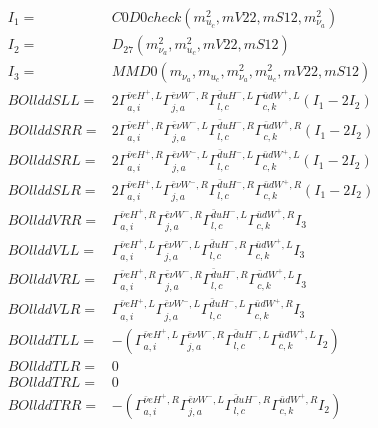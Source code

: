 \documentclass[A4,landscape]{article}
\begin{document}
\begin{align} 
I_1 = & C0D0check(m^2_{u_{{c}}}, mV22, mS12, m^2_{\nu_{{a}}}) \\ 
I_2 = & D_{27}(m^2_{\nu_{{a}}}, m^2_{u_{{c}}}, mV22, mS12) \\ 
I_3 = & MMD0(m_{\nu_{{a}}}, m_{u_{{c}}}, m^2_{\nu_{{a}}}, m^2_{u_{{c}}}, mV22, mS12) \\ 
  BOllddSLL= & 2  \Gamma^{\bar{\nu}e H^+ ,L}_{a, i} \Gamma^{\bar{e}\nu W^-,R}_{j, a} \Gamma^{\bar{d}u H^-,L}_{l, c} \Gamma^{\bar{u}d W^+ ,L}_{c, k} (I_1 - 2 I_2) \\ 
  BOllddSRR= & 2  \Gamma^{\bar{\nu}e H^+ ,R}_{a, i} \Gamma^{\bar{e}\nu W^-,L}_{j, a} \Gamma^{\bar{d}u H^-,R}_{l, c} \Gamma^{\bar{u}d W^+ ,R}_{c, k} (I_1 - 2 I_2) \\ 
  BOllddSRL= & 2  \Gamma^{\bar{\nu}e H^+ ,R}_{a, i} \Gamma^{\bar{e}\nu W^-,L}_{j, a} \Gamma^{\bar{d}u H^-,L}_{l, c} \Gamma^{\bar{u}d W^+ ,L}_{c, k} (I_1 - 2 I_2) \\ 
  BOllddSLR= & 2  \Gamma^{\bar{\nu}e H^+ ,L}_{a, i} \Gamma^{\bar{e}\nu W^-,R}_{j, a} \Gamma^{\bar{d}u H^-,R}_{l, c} \Gamma^{\bar{u}d W^+ ,R}_{c, k} (I_1 - 2 I_2) \\ 
  BOllddVRR= &  \Gamma^{\bar{\nu}e H^+ ,R}_{a, i} \Gamma^{\bar{e}\nu W^-,R}_{j, a} \Gamma^{\bar{d}u H^-,L}_{l, c} \Gamma^{\bar{u}d W^+ ,R}_{c, k} I_3 \\ 
  BOllddVLL= &  \Gamma^{\bar{\nu}e H^+ ,L}_{a, i} \Gamma^{\bar{e}\nu W^-,L}_{j, a} \Gamma^{\bar{d}u H^-,R}_{l, c} \Gamma^{\bar{u}d W^+ ,L}_{c, k} I_3 \\ 
  BOllddVRL= &  \Gamma^{\bar{\nu}e H^+ ,R}_{a, i} \Gamma^{\bar{e}\nu W^-,R}_{j, a} \Gamma^{\bar{d}u H^-,R}_{l, c} \Gamma^{\bar{u}d W^+ ,L}_{c, k} I_3 \\ 
  BOllddVLR= &  \Gamma^{\bar{\nu}e H^+ ,L}_{a, i} \Gamma^{\bar{e}\nu W^-,L}_{j, a} \Gamma^{\bar{d}u H^-,L}_{l, c} \Gamma^{\bar{u}d W^+ ,R}_{c, k} I_3 \\ 
  BOllddTLL= & -( \Gamma^{\bar{\nu}e H^+ ,L}_{a, i} \Gamma^{\bar{e}\nu W^-,R}_{j, a} \Gamma^{\bar{d}u H^-,L}_{l, c} \Gamma^{\bar{u}d W^+ ,L}_{c, k} I_2) \\ 
  BOllddTLR= & 0 \\ 
  BOllddTRL= & 0 \\ 
  BOllddTRR= & -( \Gamma^{\bar{\nu}e H^+ ,R}_{a, i} \Gamma^{\bar{e}\nu W^-,L}_{j, a} \Gamma^{\bar{d}u H^-,R}_{l, c} \Gamma^{\bar{u}d W^+ ,R}_{c, k} I_2) \\ 
\end{align} 
\end{document}
